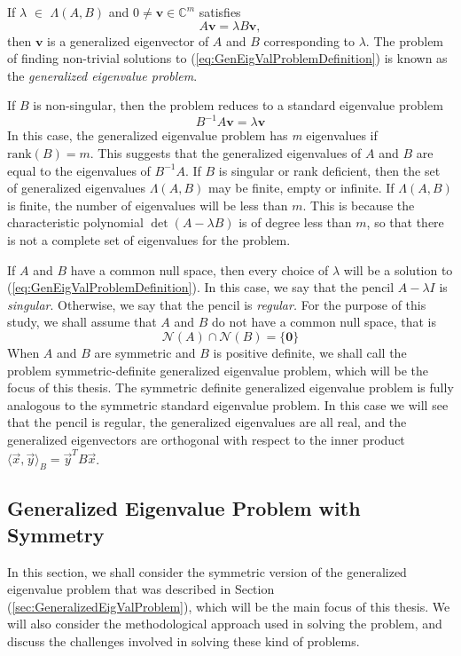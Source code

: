 If $\lambda$ $\in$ $\Lambda(A, B)$ and $0 \neq \mathbf{v} \in \mathbb{C}^m$ satisfies
\begin{equation}\label{eq:GenEigValProblemDefinition}
	A\mathbf{v} = \lambda B\mathbf{v},
\end{equation}
then $\mathbf{v}$ is a generalized eigenvector of $A$ and $B$ corresponding to $\lambda$. The problem of finding non-trivial solutions to (\ref{eq:GenEigValProblemDefinition}) is known as the \textit{generalized eigenvalue problem}.

If $B$ is non-singular, then the problem reduces to a standard eigenvalue problem
\begin{equation}\label{eq:StandardReduction}
	B^{-1}A \mathbf{v} = \lambda \mathbf{v}
\end{equation}
In this case, the generalized eigenvalue problem has \textit{m} eigenvalues if $\text{rank}(B) = m$. This suggests that the generalized eigenvalues of $A$ and $B$ are equal to the eigenvalues of $B^{-1}A$. If $B$ is singular or rank deficient, then the set of generalized eigenvalues $\Lambda(A, B)$ may be finite, empty or infinite. If $\Lambda(A, B)$ is finite, the number of eigenvalues will be less than $m$. This is because the characteristic polynomial $\det(A- \lambda B)$ is of degree less than $m$, so that there is not a complete set of eigenvalues for the problem.

If $A$ and $B$ have a common null space, then every choice of $\lambda$ will be a solution to (\ref{eq:GenEigValProblemDefinition}). In this case, we say that the pencil $A-\lambda I$ is {\em singular}.  Otherwise, we say that the pencil is {\em regular.}   For the purpose of this study, we shall assume that $A$ and $B$ do not have a common null space, that is
\begin{equation}\label{eq:EmptyCommonNullSpace}
	\mathcal{N}(A) \cap \mathcal{N}(B) = \{\mathbf{0} \}
\end{equation}
When $A$ and $B$ are symmetric and $B$ is positive definite, we shall call the problem symmetric-definite generalized eigenvalue problem, which will be the focus of this thesis. The symmetric definite generalized eigenvalue problem is fully analogous to the symmetric standard eigenvalue problem.  In this case we will see that the pencil is regular, the generalized eigenvalues are all real, and the generalized eigenvectors are orthogonal with respect to the inner product $\langle\vec{x}, \vec{y}\rangle_B = \vec{y}^T B \vec{x}$.

\subsection{Generalized Eigenvalue Problem with Symmetry}\label{sec:ProblemDiscussion}
In this section, we shall consider the symmetric version of the generalized eigenvalue problem that was described in Section (\ref{sec:GeneralizedEigValProblem}), which will be the main focus of this thesis. We will also consider the methodological approach used in solving the problem, and discuss the challenges involved in solving these kind of problems.

